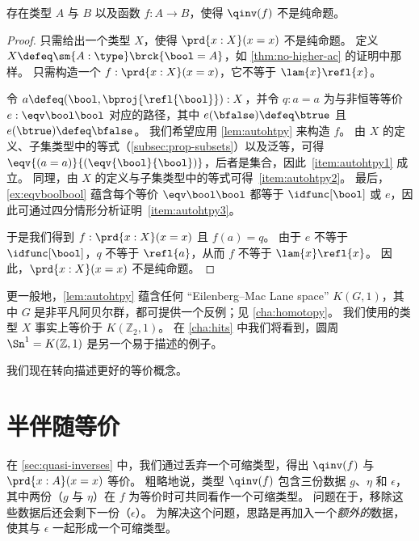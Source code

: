 \begin{thm}\label{thm:qinv-notprop}
  存在类型 $A$ 与 $B$ 以及函数 $f:A\to B$，使得 $\qinv(f)$ 不是纯命题。
\end{thm}
\begin{proof}
  只需给出一个类型 $X$，使得 $\prd{x:X} (x=x)$ 不是纯命题。
  定义 $X\defeq \sm{A:\type} \brck{\bool=A}$，如 \cref{thm:no-higher-ac} 的证明中那样。
  只需构造一个 $f:\prd{x:X} (x=x)$，它不等于 $\lam{x} \refl{x}$。

  令 $a \defeq (\bool,\bproj{\refl{\bool}}) : X$，并令 $q:a=a$ 为与非恒等等价 $e:\eqv\bool\bool$ 对应的路径，其中 $e(\bfalse)\defeq\btrue$ 且 $e(\btrue)\defeq\bfalse$。
  我们希望应用 \cref{lem:autohtpy} 来构造 $f$。
  由 $X$ 的定义、子集类型中的等式（\cref{subsec:prop-subsets}）以及泛等，可得 $\eqv{(a=a)}{(\eqv{\bool}{\bool})}$，后者是集合，因此~\ref{item:autohtpy1} 成立。
  同理，由 $X$ 的定义与子集类型中的等式可得~\ref{item:autohtpy2}。
  最后，\cref{ex:eqvboolbool} 蕴含每个等价 $\eqv\bool\bool$ 都等于 $\idfunc[\bool]$ 或 $e$，因此可通过四分情形分析证明~\ref{item:autohtpy3}。

  于是我们得到 $f:\prd{x:X} (x=x)$ 且 $f(a) = q$。
  由于 $e$ 不等于 $\idfunc[\bool]$，$q$ 不等于 $\refl{a}$，从而 $f$ 不等于 $\lam{x} \refl{x}$。
  因此，$\prd{x:X} (x=x)$ 不是纯命题。
\end{proof}

更一般地，\cref{lem:autohtpy} 蕴含任何 ``Eilenberg--Mac Lane space'' $K(G,1)$，其中 $G$ 是非平凡阿贝尔群，都可提供一个反例；见 \cref{cha:homotopy}。
我们使用的类型 $X$ 事实上等价于 $K(\mathbb{Z}_2,1)$。
在 \cref{cha:hits} 中我们将看到，圆周 $\Sn^1 = K(\mathbb{Z},1)$ 是另一个易于描述的例子。

我们现在转向描述更好的等价概念。

%

\section{半伴随等价}
\label{sec:hae}

%
%
%

在 \cref{sec:quasi-inverses} 中，我们通过丢弃一个可缩类型，得出 $\qinv(f)$ 与 $\prd{x:A} (x=x)$ 等价。
粗略地说，类型 $\qinv(f)$ 包含三份数据 $g$、$\eta$ 和 $\epsilon$，其中两份（$g$ 与 $\eta$）在 $f$ 为等价时可共同看作一个可缩类型。
问题在于，移除这些数据后还会剩下一份（$\epsilon$）。
为解决这个问题，思路是再加入一个\emph{额外的}数据，使其与 $\epsilon$ 一起形成一个可缩类型。


